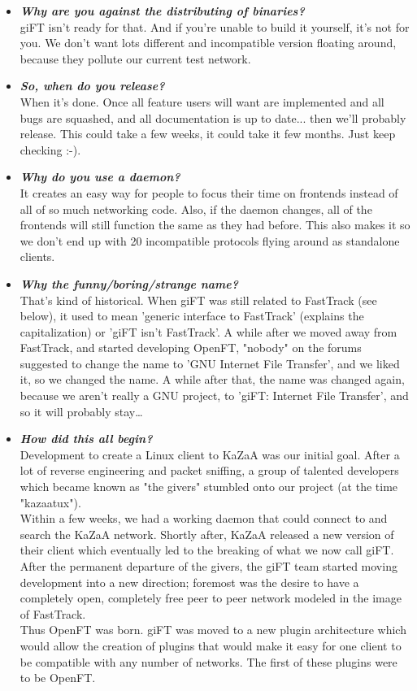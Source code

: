\documentclass[10pt]{article}
\newcommand{\question}[1]{\item\textbf{\emph{#1}}}
\begin{document}
\begin{itemize}
\question {Why are you against the distributing of binaries?}\\
giFT isn't ready for that. And if you're unable to build it
yourself, it's not for you.  We don't want lots different and
incompatible version floating around, because they pollute our
current test network.

\question {So, when do you release?}\\
When it's done. Once all feature users will want are implemented
and all bugs are squashed, and all documentation is up to date...
then we'll probably release. This could take a few weeks, it could
take it few months. Just keep checking :-).

\question {Why do you use a daemon?}\\
It creates an easy way for people to focus their time on frontends
instead of all of so much networking code. Also, if the daemon
changes, all of the frontends will still function the same as they
had before. This also makes it so we don't end up with 20
incompatible protocols flying around as standalone clients.

\question {Why the funny/boring/strange name?}\\
That's kind of historical. When giFT was still related to
FastTrack (see below), it used to mean 'generic interface to
FastTrack' (explains the capitalization) or 'giFT isn't
FastTrack'. A while after we moved away from FastTrack, and
started developing OpenFT, "nobody" on the forums suggested to
change the name to 'GNU Internet File Transfer', and we liked it,
so we changed the name.  A while after that, the name was changed
again, because we aren't really a GNU project, to 'giFT: Internet
File Transfer', and so it will probably stay\ldots

\question {How did this all begin?}\\
Development to create a Linux client to KaZaA was our initial
goal. After a lot of reverse engineering and packet sniffing, a
group of talented developers which became known as "the givers"
stumbled onto our project (at the time "kazaatux"). \\
Within a few weeks, we had a working daemon that could connect to
and search the KaZaA network. Shortly after, KaZaA released a new
version of their client which eventually led to the breaking of
what we now call giFT. \\
After the permanent departure of the givers, the giFT team started
moving development into a new direction; foremost was the desire
to have a completely open, completely free peer to peer network
modeled in the image of FastTrack. \\
Thus OpenFT was born. giFT was moved to a new plugin architecture
which would allow the creation of plugins that would make it easy
for one client to be compatible with any number of networks. The
first of these plugins were to be OpenFT.

\end{itemize}
\end{document}
